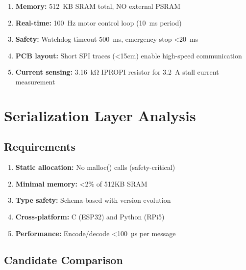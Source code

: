 \begin{enumerate}
    \item \textbf{Memory:} 512~KB SRAM total, NO external PSRAM
    \item \textbf{Real-time:} 100~Hz motor control loop (10~ms period)
    \item \textbf{Safety:} Watchdog timeout 500~ms, emergency stop <20~ms
    \item \textbf{PCB layout:} Short SPI traces (<15cm) enable high-speed communication
    \item \textbf{Current sensing:} 3.16~kΩ IPROPI resistor for 3.2~A stall current measurement
\end{enumerate}

\section{Serialization Layer Analysis}

\subsection{Requirements}

\begin{enumerate}
    \item \textbf{Static allocation:} No malloc() calls (safety-critical)
    \item \textbf{Minimal memory:} <2\% of 512KB SRAM
    \item \textbf{Type safety:} Schema-based with version evolution
    \item \textbf{Cross-platform:} C (ESP32) and Python (RPi5)
    \item \textbf{Performance:} Encode/decode <100~µs per message
\end{enumerate}

\subsection{Candidate Comparison}

